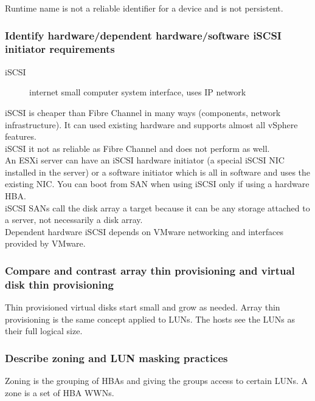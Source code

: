 Runtime name is not a reliable identifier for a device and is not persistent.

\subsubsection{Identify hardware/dependent hardware/software iSCSI initiator requirements}

\begin{description}
\item[iSCSI]
internet small computer system interface, uses IP network
\end{description}

iSCSI is cheaper than Fibre Channel in many ways (components, network
infrastructure). It can used existing hardware and supports almost all vSphere
features.\\

iSCSI it not as reliable as Fibre Channel and does not perform as well.\\

An ESXi server can have an iSCSI hardware initiator (a special iSCSI NIC
installed in the server) or a software initiator which is all in software and
uses the existing NIC. You can boot from SAN when using iSCSI only if using a
hardware HBA.\\

iSCSI SANs call the disk array a target because it can be any storage attached
to a server, not necessarily a disk array.\\

Dependent hardware iSCSI depends on VMware networking and interfaces provided
by VMware.

\subsubsection{Compare and contrast array thin provisioning and virtual disk thin provisioning}

Thin provisioned virtual disks start small and grow as needed. Array thin
provisioning is the same concept applied to LUNs. The hosts see the LUNs as
their full logical size.

\subsubsection{Describe zoning and LUN masking practices}

Zoning is the grouping of HBAs and giving the groups access to certain LUNs.
A zone is a set of HBA WWNs.\\

